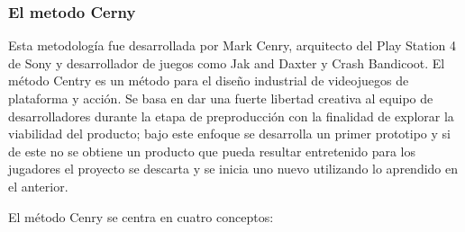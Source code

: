 \subsubsection{El metodo Cerny} \label{MetodoCerny}
Esta metodología fue desarrollada por Mark Cenry, arquitecto del Play Station 4 
de Sony y desarrollador de juegos como Jak and Daxter y Crash Bandicoot. El 
método Centry es un método para el diseño industrial de videojuegos de plataforma 
y acción. Se basa en dar una fuerte libertad creativa al equipo de desarrolladores 
durante la etapa de preproducción con la finalidad de explorar la viabilidad 
del producto; bajo este enfoque se desarrolla un primer prototipo y si de este 
no se obtiene un producto que pueda resultar entretenido para los jugadores el 
proyecto se descarta y se inicia uno nuevo utilizando lo aprendido en el anterior.
\\
\par
El método Cenry se centra en cuatro conceptos:
